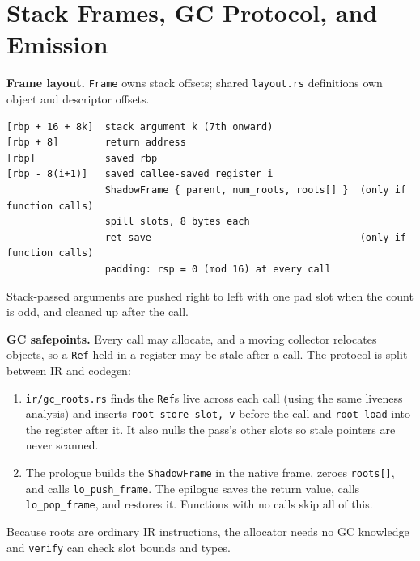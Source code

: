 \documentclass[10pt]{article}
\newcommand{\code}[1]{\texttt{\small #1}}
\begin{document}
\section{Stack Frames, GC Protocol, and Emission}\label{sec:frames}
\textbf{Frame layout.} \code{Frame} owns stack offsets; shared \code{layout.rs} definitions own object and descriptor offsets.
\begin{lstlisting}
[rbp + 16 + 8k]  stack argument k (7th onward)
[rbp + 8]        return address
[rbp]            saved rbp
[rbp - 8(i+1)]   saved callee-saved register i
                 ShadowFrame { parent, num_roots, roots[] }  (only if function calls)
                 spill slots, 8 bytes each
                 ret_save                                    (only if function calls)
                 padding: rsp = 0 (mod 16) at every call
\end{lstlisting}
Stack-passed arguments are pushed right to left with one pad slot when the count is odd, and cleaned up after the call.

\textbf{GC safepoints.} Every call may allocate, and a moving collector relocates objects, so a \code{Ref} held in a register may be stale after a call. The protocol is split between IR and codegen:
\begin{enumerate}
  \item \code{ir/gc\_roots.rs} finds the \code{Ref}s live across each call (using the same liveness analysis) and inserts \code{root\_store slot, v} before the call and \code{root\_load} into the register after it. It also nulls the pass's other slots so stale pointers are never scanned.
  \item The prologue builds the \code{ShadowFrame} in the native frame, zeroes \code{roots[]}, and calls \code{lo\_push\_frame}. The epilogue saves the return value, calls \code{lo\_pop\_frame}, and restores it. Functions with no calls skip all of this.
\end{enumerate}
Because roots are ordinary IR instructions, the allocator needs no GC knowledge and \code{verify} can check slot bounds and types.
\end{document}
